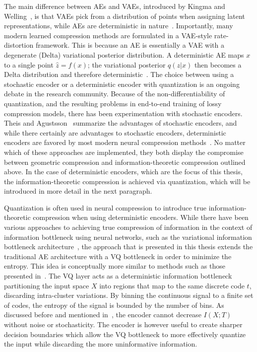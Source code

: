 The main difference between AEs and VAEs, introduced by Kingma and Welling~\cite{Kingma2013}, is that VAEs pick from a distribution of points when assigning latent representations, while AEs are deterministic in nature~\cite{Chen2023}. Importantly, many modern learned compression methods are formulated in a VAE-style rate-distortion framework. This is because an AE is essentially a VAE with a degenerate (Delta) variational posterior distribution. A deterministic AE maps $x$ to a single point $\hat{z} = f(x)$; the variational posterior $q(z|x)$ then becomes a Delta distribution and therefore deterministic~\cite[pp.~145--146]{Yang2022}. The choice between using a stochastic encoder or a deterministic encoder with quantization is an ongoing debate in the research community. Because of the non-differentiability of quantization, and the resulting problems in end-to-end training of lossy compression models, there has been experimentation with stochastic encoders. Theis and Agustsson~\cite{Theis2021} summarize the advantages of stochastic encoders, and while there certainly are advantages to stochastic encoders, deterministic encoders are favored by most modern neural compression methods~\cite{Yang2022, Theis2021}. No matter which of these approaches are implemented, they both display the compromise between geometric compression and information-theoretic compression outlined above. In the case of deterministic encoders, which are the focus of this thesis, the information-theoretic compression is achieved via quantization, which will be introduced in more detail in the next paragraph.

Quantization is often used in neural compression to introduce true information-theoretic compression when using deterministic encoders. While there have been various approaches to achieving true compression of information in the context of information bottleneck using neural networks, such as the variational information bottleneck architecture~\cite{Alemi2016}, the approach that is presented in this thesis extends the traditional AE architecture with a VQ bottleneck in order to minimize the entropy. This idea is conceptually more similar to methods such as those presented in~\cite[pp.~1611--1630]{Strouse2016}. The VQ layer acts as a deterministic information bottleneck partitioning the input space $X$ into regions that map to the same discrete code $t$, discarding intra-cluster variations. By binning the continuous signal to a finite set of codes, the entropy of the signal is bounded by the number of bins. As discussed before and mentioned in~\cite{Saxe2018}, the encoder cannot decrease $I(X;T)$ without noise or stochasticity. The encoder is however useful to create sharper decision boundaries which allow the VQ bottleneck to more effectively quantize the input while discarding the more uninformative information. 

